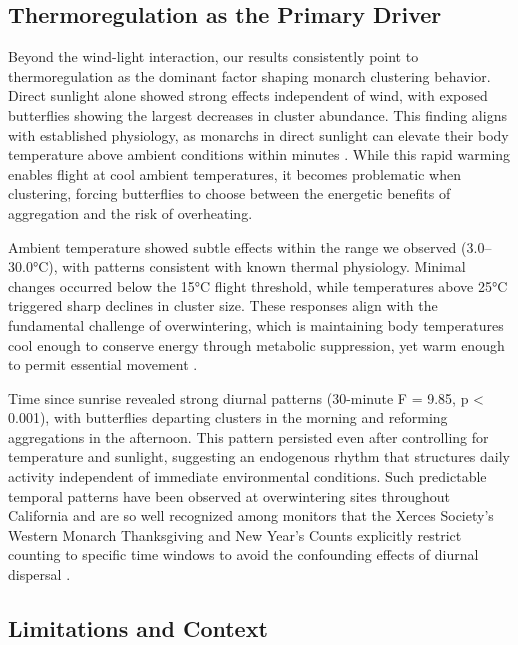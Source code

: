 \subsection{Thermoregulation as the Primary Driver}

Beyond the wind-light interaction, our results consistently point to thermoregulation as the dominant factor shaping monarch clustering behavior. Direct sunlight alone showed strong effects independent of wind, with exposed butterflies showing the largest decreases in cluster abundance. This finding aligns with established physiology, as monarchs in direct sunlight can elevate their body temperature above ambient conditions within minutes \parencite{mastersMonarchButterflyDanaus1988}. While this rapid warming enables flight at cool ambient temperatures, it becomes problematic when clustering, forcing butterflies to choose between the energetic benefits of aggregation and the risk of overheating.

Ambient temperature showed subtle effects within the range we observed (3.0--30.0°C), with patterns consistent with known thermal physiology. Minimal changes occurred below the 15°C flight threshold, while temperatures above 25°C triggered sharp declines in cluster size. These responses align with the fundamental challenge of overwintering, which is maintaining body temperatures cool enough to conserve energy through metabolic suppression, yet warm enough to permit essential movement \parencite{mastersMonarchButterflyDanaus1988}.

Time since sunrise revealed strong diurnal patterns (30-minute F = 9.85, p < 0.001), with butterflies departing clusters in the morning and reforming aggregations in the afternoon. This pattern persisted even after controlling for temperature and sunlight, suggesting an endogenous rhythm that structures daily activity independent of immediate environmental conditions. Such predictable temporal patterns have been observed at overwintering sites throughout California \parencite{tuskesOverwinteringEcologyMonarch1978,chaplinEnergyReservesMetabolic1982} and are so well recognized among monitors that the Xerces Society's Western Monarch Thanksgiving and New Year's Counts explicitly restrict counting to specific time windows to avoid the confounding effects of diurnal dispersal \parencite{xercessocietyWesternMonarchThanksgiving2025}.

\subsection{Limitations and Context}

